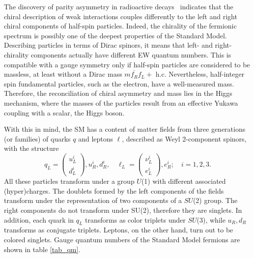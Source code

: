 The discovery of parity asymmetry in radioactive decays~\parencite{PhysRev.105.1413} indicates that the chiral description of weak interactions couples differently to the left and right chiral components of half-spin particles. Indeed, the chirality of the fermionic spectrum is possibly one of the deepest properties of the Standard Model. Describing particles in terms of Dirac spinors, it means that left- and right-chirality components actually have different EW quantum numbers. This is compatible with a gauge symmetry only if half-spin particles are considered to be massless, at least without a Dirac mass $m \overline{f_{R}} f_{L}+\text { h.c.}$ Nevertheless, half-integer spin fundamental particles, such as the electron, have a well-measured mass. Therefore, the reconciliation of chiral asymmetry and mass lies in the Higgs mechanism, where the masses of the particles result from an effective Yukawa coupling with a scalar, the Higgs boson.

With this in mind, the SM has a content of matter fields from three generations (or families) of quarks $q$ and leptons $\ell$, described as Weyl 2-component spinors, with the structure
\begin{equation}
	q_{L}=\left(
		\begin{array}{c}
			u_{L}^{i} \\
			d_{L}^{i}
		\end{array}
	\right), 
	u_{R}^{i}, d_{R}^{i}, 
	\quad \ell_L=\left(
		\begin{array}{c}
			\nu_{L}^{i} \\
			e_{L}^{i}
		\end{array}
	\right), e_{R}^{i} ; \quad i=1,2,3 .
\end{equation}
All these particles transform under a group $U$(1) with different associated (hyper)charges.
The doublets formed by the left components of the fields transform under the representation of two components of a $SU$(2) group. The right components do not transform under SU(2), therefore they are singlets.
In addition, each quark in $q_{L}$ transforms as color triplets under $SU$(3), while $u_{R}, d_{R}$ transforms as conjugate triplets. Leptons, on the other hand, turn out to be colored singlets.
Gauge quantum numbers of the Standard Model fermions are shown in table \ref{tab_qm}.

